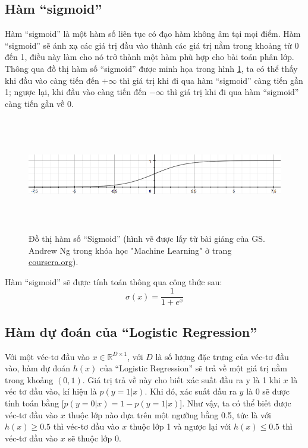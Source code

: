 \subsection{Hàm ``sigmoid''}
Hàm ``sigmoid'' là một hàm số liên tục có đạo hàm không âm tại mọi điểm. Hàm ``sigmoid'' sẽ ánh xạ các giá trị đầu vào thành các giá trị nằm trong khoảng từ 0 đến 1, điều này làm cho nó trở thành một hàm phù hợp cho bài toán phân lớp. Thông qua đồ thị hàm số ``sigmoid'' được minh họa trong hình \ref{fig:2.2_sigmoid}, ta có thể thấy khi đầu vào càng tiến đến $+\infty$ thì giá trị khi đi qua hàm ``sigmoid'' càng tiến gần 1; ngược lại, khi đầu vào càng tiến đến $-\infty$ thì giá trị khi đi qua hàm ``sigmoid'' càng tiến gần về 0.
\begin{figure}[h]
    \centering
    \includegraphics[width=\textwidth, height=5cm]{images/Chapter2/sigmoid.png}
    \caption{Đồ thị hàm số ``Sigmoid'' (hình vẽ được lấy từ bài giảng của GS. Andrew Ng trong khóa học "Machine Learning" ở trang \href{https://www.coursera.org/learn/machine-learning}{coursera.org}).}
    \label{fig:2.2_sigmoid}
\end{figure}

Hàm ``sigmoid'' sẽ được tính toán thông qua công thức sau:
\begin{equation}
    \sigma(x) = \frac{1}{1+ e^{x}}
    \label{eq:2.2_sigmoid}
\end{equation}

\subsection{Hàm dự đoán của ``Logistic Regression''}
Với một véc-tơ đầu vào $x \in \mathbb{R}^{D\times 1}$, với $D$ là số lượng đặc trưng của véc-tơ đầu vào, hàm dự đoán $h(x)$ của ``Logistic Regression'' sẽ trả về một giá trị nằm trong khoảng $(0,1)$. Giá trị trả về này cho biết xác suất đầu ra y là 1 khi $x$ là véc tơ đầu vào, kí hiệu là $p(y=1|x)$. Khi đó, xác suất đầu ra $y$ là 0 sẽ được tính toán bằng [$p(y=0|x) = 1 - p(y=1|x)$]. Như vậy, ta có thể biết được véc-tơ đầu vào $x$ thuộc lớp nào dựa trên một ngưỡng bằng 0.5, tức là với $h(x) \geq 0.5$ thì véc-tơ đầu vào $x$ thuộc lớp 1 và ngược lại với $h(x) \leq 0.5$ thì véc-tơ đầu vào $x$ sẽ thuộc lớp 0.

